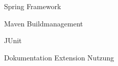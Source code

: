 \begin{frame}


\begin{block}{}
	Spring Framework
\end{block}
\begin{block}{}
	Maven Buildmanagement
\end{block}
\begin{block}{}
	JUnit
\end{block}
\begin{block}{}
	Dokumentation Extension Nutzung
\end{block}

\end{frame}
